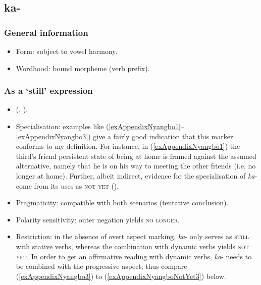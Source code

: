 \subsection{ka-}
\subsubsection{General information}
\begin{itemize}
	\item Form: subject to vowel harmony.
	\item Wordhood: bound morpheme (verb prefix).
\end{itemize}


\subsubsection{As a  \lq still\rq{ }expression}
\begin{itemize}
	\item \citeauthor{Essegbey2012} (\citeyear{Essegbey2012}, \citeyear[159–161]{Essegbey2019}).
	\item Specialisation: examples like (\ref{exAppendixNyangbo1}–\ref{exAppendixNyangbo3}) give a fairly good indication that this marker conforms to my definition. For instance, in (\ref{exAppendixNyangbo1}) the third's friend persistent state of being at home is framed against the assumed alternative, namely that he is on his way to meeting the other friends (i.e. no longer at home). Further, albeit indirect, evidence for the specialisation of \mbox{\textit{ka}-} come from its uses as \textsc{not yet} ().
	\item Pragmaticity: compatible with both scenarios (tentative conclusion).
	\item Polarity sensitivity: outer negation yields \textsc{no longer}.
	\item Restriction: in the absence of overt aspect marking, \mbox{\textit{ka}-} only serves as \textsc{still} with stative verbs, whereas the combination with dynamic verbs yields \textsc{not yet}. In order to get an affirmative reading with dynamic verbs, \mbox{\textit{ka}-} needs to be combined with the progressive aspect; thus compare (\ref{exAppendixNyangbo3}) to (\ref{exAppendixNyangboNotYet3}) below.
\end{itemize}
